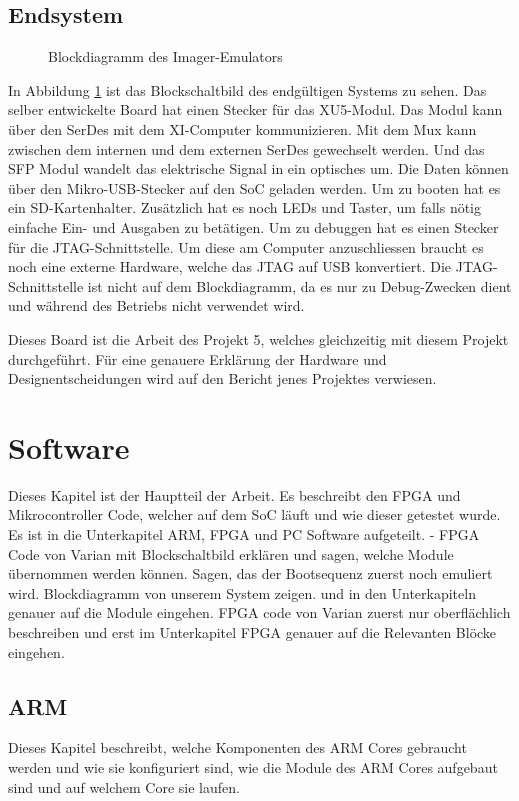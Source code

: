 \documentclass{article}
\begin{document}
\subsection{Endsystem}
\begin{figure}[tb]
    \caption{Blockdiagramm des Imager-Emulators}
    \label{fig:bd_top}
\end{figure}

In Abbildung \ref{fig:bd_top} ist das Blockschaltbild des endgültigen Systems zu sehen. Das selber entwickelte Board hat einen Stecker für das XU5-Modul. Das Modul kann über den SerDes mit dem XI-Computer kommunizieren. Mit dem Mux kann zwischen dem internen und dem externen SerDes gewechselt werden. Und das SFP Modul wandelt das elektrische Signal in ein optisches um. Die Daten können über den Mikro-USB-Stecker auf den SoC geladen werden. Um zu booten hat es ein SD-Kartenhalter. Zusätzlich hat es noch LEDs und Taster, um falls nötig einfache Ein- und Ausgaben zu betätigen. Um zu debuggen hat es einen Stecker für die JTAG-Schnittstelle. Um diese am Computer anzuschliessen braucht es noch eine externe Hardware, welche das JTAG auf USB konvertiert. Die JTAG-Schnittstelle ist nicht auf dem Blockdiagramm, da es nur zu Debug-Zwecken dient und während des Betriebs nicht verwendet wird. 

Dieses Board ist die Arbeit des Projekt 5, welches gleichzeitig mit diesem Projekt durchgeführt. Für eine genauere Erklärung der Hardware und Designentscheidungen wird auf den Bericht jenes Projektes verwiesen. 

\section{Software}
Dieses Kapitel ist der Hauptteil der Arbeit. Es beschreibt den FPGA und Mikrocontroller Code, welcher auf dem SoC läuft und wie dieser getestet wurde. Es ist in die Unterkapitel ARM, FPGA und PC Software aufgeteilt.
- FPGA Code von Varian mit Blockschaltbild erklären und sagen, welche Module übernommen werden können. Sagen, das der Bootsequenz zuerst noch emuliert wird.
Blockdiagramm von unserem System zeigen. und in den Unterkapiteln genauer auf die Module eingehen. FPGA code von Varian zuerst nur oberflächlich beschreiben und erst im Unterkapitel FPGA genauer auf die Relevanten Blöcke eingehen.
\subsection{ARM}
Dieses Kapitel beschreibt, welche Komponenten des ARM Cores gebraucht werden und wie sie konfiguriert sind, wie die Module des ARM Cores aufgebaut sind und auf welchem Core sie laufen.
\end{document}
